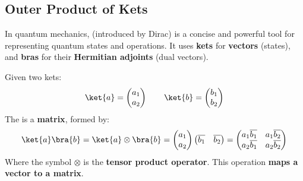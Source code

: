 \subsection{Outer Product of Kets}

In quantum mechanics,  (introduced by Dirac) is a concise and powerful tool for representing quantum states and operations. It uses \textbf{kets} \ket{\psi} for \textbf{vectors} (states), and \textbf{bras} \bra{\psi} for their \textbf{Hermitian adjoints} (dual vectors).

\highspace
Given two kets:
\begin{equation*}
    \ket{a} = \begin{pmatrix}
        a_{1} \\
        a_{2}
    \end{pmatrix}
    \hspace{2em}
    \ket{b} = \begin{pmatrix}
        b_{1} \\
        b_{2}
    \end{pmatrix}
\end{equation*}
The   is a \textbf{matrix}, formed by:
\begin{equation}
    \ket{a}\bra{b} = \ket{a} \otimes \bra{b} = \begin{pmatrix}
        a_{1} \\
        a_{2}
    \end{pmatrix}
    \begin{pmatrix}
        \overline{b_{1}} & \overline{b_{2}}
    \end{pmatrix}
    =
    \begin{pmatrix}
        a_{1}\overline{b_{1}} & a_{1}\overline{b_{2}} \\
        a_{2}\overline{b_{1}} & a_{2}\overline{b_{2}}
    \end{pmatrix}
\end{equation}
Where the symbol $\otimes$ is the \textbf{tensor product operator}. This operation \textbf{maps a vector to a matrix}.

